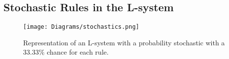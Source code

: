 \subsection{Stochastic Rules in the L-system} \label{Stochastic L-system Subsection}

\begin{flushleft}

\begin{figure}[htbp]
	{\centering
		\vspace{7px}
		\texttt{[image: Diagrams/stochastics.png]}
		\caption{Representation of an L-system with a probability stochastic with a 33.33\% chance for each rule.}
	}
\end{figure}

\FloatBarrier


\end{flushleft}






